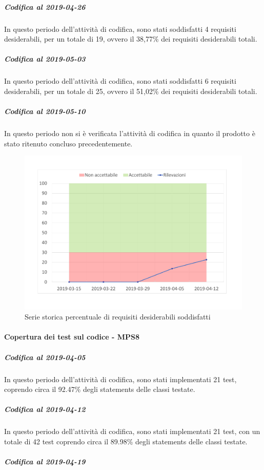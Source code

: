 \subparagraph{Codifica al 2019-04-26}
In questo periodo dell'attività di codifica, sono stati soddisfatti 4 requisiti desiderabili, per un totale di 19, ovvero il 38,77\% dei requisiti desiderabili totali.

\subparagraph{Codifica al 2019-05-03}
In questo periodo dell'attività di codifica, sono stati soddisfatti 6 requisiti desiderabili, per un totale di 25, ovvero il 51,02\% dei requisiti desiderabili totali.

\subparagraph{Codifica al 2019-05-10}
In questo periodo non si è verificata l'attività di codifica in quanto il prodotto è stato ritenuto concluso precedentemente.

\begin{figure}[H]
	\centering
	\includegraphics[scale=0.6]{images/resoconto/MPS7Chart.pdf}
	\caption{Serie storica percentuale di requisiti desiderabili soddisfatti}	
\end{figure}

\paragraph{Copertura dei test sul codice - MPS8}
\subparagraph{Codifica al 2019-04-05}
In questo periodo dell'attività di codifica, sono stati implementati 21 test, coprendo circa il 92.47\% degli statements delle classi testate.

\subparagraph{Codifica al 2019-04-12}
In questo periodo dell'attività di codifica, sono stati implementati 21 test, con un totale di 42 test coprendo circa il 89.98\% degli statements delle classi testate.

\subparagraph{Codifica al 2019-04-19}

